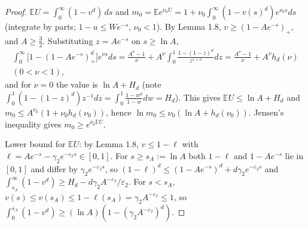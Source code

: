 \documentclass[11pt,a4paper]{article}
\theoremstyle{definition}
\theoremstyle{remark}
\begin{document}
\begin{proof}
$\mathbb EU=\int_0^\infty(1-v^d)\,ds$ and $m_0=\mathbb Ee^{\nu_0U}=1+\nu_0\int_0^\infty(1-v(s)^d)e^{\nu_0s}ds$ (integrate by parts; $1-u\le We^{-s}$, $\nu_0<1$). By Lemma 1.8, $v\ge(1-Ae^{-s})_+$, and $A\ge\frac32$. Substituting $z=Ae^{-s}$ on $s\ge\ln A$,
\begin{gather*}
\int_0^\infty\bigl[1-(1-Ae^{-s})_+^d\bigr]e^{\nu s}ds=\frac{A^\nu-1}{\nu}+A^\nu\int_0^1\frac{1-(1-z)^d}{z^{1+\nu}}dz=\frac{A^\nu-1}{\nu}+A^\nu h_d(\nu) \\
(0<\nu<1),
\end{gather*}
and for $\nu=0$ the value is $\ln A+H_d$ (note $\int_0^1(1-(1-z)^d)z^{-1}dz=\int_0^1\frac{1-w^d}{1-w}dw=H_d$). This gives $\mathbb EU\le\ln A+H_d$ and $m_0\le A^{\nu_0}(1+\nu_0h_d(\nu_0))$, hence $\ln m_0\le\nu_0(\ln A+h_d(\nu_0))$. Jensen's inequality gives $m_0\ge e^{\nu_0\mathbb EU}$.

Lower bound for $\mathbb EU$: by Lemma 1.8, $v\le1-\ell$ with $\ell=Ae^{-s}-\gamma_2e^{-\varepsilon_2s}\in[0,1]$. For $s\ge s_A:=\ln A$ both $1-\ell$ and $1-Ae^{-s}$ lie in $[0,1]$ and differ by $\gamma_2e^{-\varepsilon_2s}$, so $(1-\ell)^d\le(1-Ae^{-s})^d+d\gamma_2e^{-\varepsilon_2s}$ and $\int_{s_A}^\infty(1-v^d)\ge H_d-d\gamma_2A^{-\varepsilon_2}/\varepsilon_2$. For $s<s_A$, $v(s)\le v(s_A)\le1-\ell(s_A)=\gamma_2A^{-\varepsilon_2}\le1$, so $\int_0^{s_A}(1-v^d)\ge(\ln A)(1-(\gamma_2A^{-\varepsilon_2})^d)$.
\end{proof}
\end{document}
